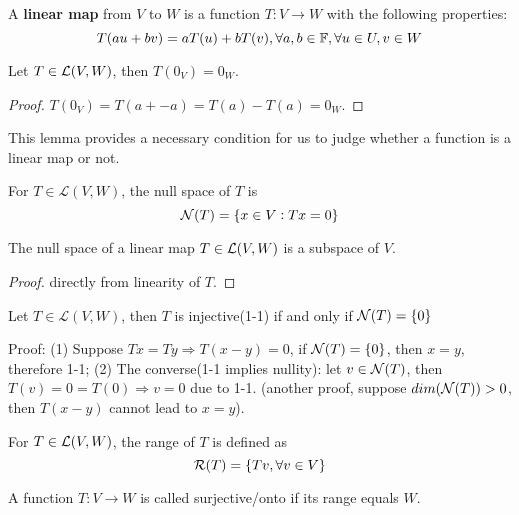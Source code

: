 \begin{refsection}
\begin{definition}
\cite[54]{axler2015linear}A \textbf{linear map} from $V$ to $W$ is a function $T: V\to W$ with the following properties:
$$T(au+bv) = aT(u) + bT(v), \forall a,b \in \mathbb{F},\forall u \in U, v\in W$$
\end{definition}

\begin{lemma}
Let $T\in \mathcal{L}(V,W)$, then $T(0_V) = 0_W$.
\end{lemma}
\begin{proof}
	$T(0_V) = T(a+-a) = T(a) - T(a) = 0_W$.
\end{proof}

\begin{remark}
This lemma provides a necessary condition for us to judge whether a function is a linear map or not. 
\end{remark}

\begin{definition}
\cite[59]{axler2015linear} For $T\in \mathcal{L}(V,W)$, the null space of $T$ is
$$\mathcal{N}(T) = \{x\in V: Tx  = 0\}$$
\end{definition}

\begin{lemma}
The null space of a linear map $T\in \mathcal{L}(V,W)$ is a subspace of $V$.
\end{lemma}
\begin{proof}
	directly from linearity of $T$.
\end{proof}


\begin{lemma}\label{ch:linearalgebra:th:linearMapsZeroNullSpaceEquivalentToOneOne}
Let $T\in \mathcal{L}(V,W)$, then $T$ is injective(1-1) if and only if $\mathcal{N}(T) = \{0\}$
\end{lemma}
Proof: (1) Suppose $Tx = Ty \Rightarrow T(x-y) = 0$, if $\mathcal{N}(T)=\{0\}$, then $x=y$, therefore 1-1; (2) The converse(1-1 implies nullity): let $v\in \mathcal{N}(T)$, then $T(v) = 0 = T(0) \Rightarrow v = 0$ due to 1-1. (another proof, suppose $dim(\mathcal{N}(T)) > 0$, then $T(x-y)$ cannot lead to $x = y$).

\begin{definition}[range]
For $T\in \mathcal{L}(V,W)$, the range of $T$ is defined as
$$\mathcal{R}(T) = \{Tv ,\forall v\in V\}$$
\end{definition}

\begin{definition}
A function $T:V\to W$ is called surjective/onto if its range equals $W$.
\end{definition}


\end{refsection}
